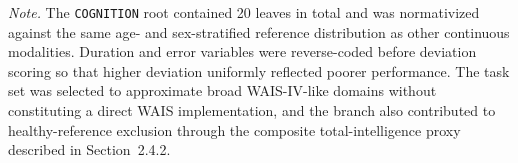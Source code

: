 \documentclass[11pt,a4paper,twoside]{article}
\renewcommand{\arraystretch}{1.2}
\begin{document}
\begin{table}[H]
\begin{tabularx}{\linewidth}{p{0.18\linewidth} p{0.16\linewidth} X p{0.19\linewidth}}
\bottomrule
\end{tabularx}
\par\smallskip\noindent\small\textit{Note.} The \texttt{COGNITION} root contained 20 leaves in total and was normativized against the same age- and sex-stratified reference distribution as other continuous modalities. Duration and error variables were reverse-coded before deviation scoring so that higher deviation uniformly reflected poorer performance. The task set was selected to approximate broad WAIS-IV-like domains without constituting a direct WAIS implementation, and the branch also contributed to healthy-reference exclusion through the composite total-intelligence proxy described in Section~2.4.2.
\end{table}

\begingroup
\footnotesize
\setlength{\LTleft}{0pt}
\setlength{\LTright}{0pt}
\setlength{\tabcolsep}{4pt}
\renewcommand{\arraystretch}{1.1}
\end{document}
